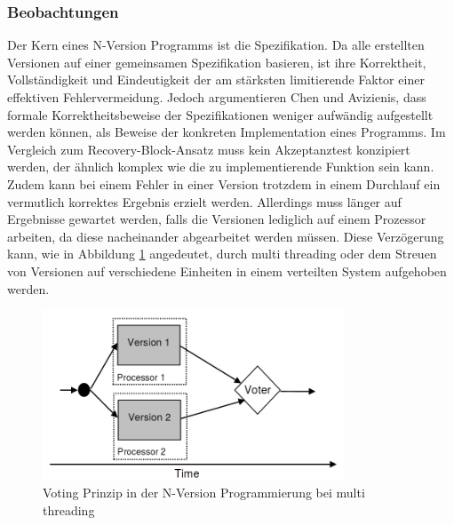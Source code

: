\subsubsection{Beobachtungen}
Der Kern eines N-Version Programms ist die Spezifikation.
Da alle erstellten Versionen auf einer gemeinsamen Spezifikation basieren, ist ihre Korrektheit, Vollständigkeit und Eindeutigkeit der am stärksten limitierende Faktor einer effektiven Fehlervermeidung.
Jedoch argumentieren Chen und Avizienis, dass formale Korrektheitsbeweise der Spezifikationen weniger aufwändig aufgestellt werden können, als Beweise der konkreten Implementation eines Programms.
Im Vergleich zum Recovery-Block-Ansatz muss kein Akzeptanztest konzipiert werden, der ähnlich komplex wie die zu implementierende Funktion sein kann. Zudem kann bei einem Fehler in einer Version trotzdem in einem Durchlauf ein vermutlich korrektes Ergebnis erzielt werden. Allerdings muss länger auf Ergebnisse gewartet werden, falls die Versionen lediglich auf einem Prozessor arbeiten, da diese nacheinander abgearbeitet werden müssen. Diese Verzögerung kann, wie in Abbildung \ref{graph-n-version-multi} angedeutet, durch multi threading oder dem Streuen von Versionen auf verschiedene Einheiten in einem verteilten System aufgehoben werden.
%
\begin{figure}[ht]
	\centering
	\includegraphics[width=0.8\textwidth,natwidth=901,natheight=333]{grafiken/multi-thread-n-version.png}
	\caption{Voting Prinzip in der N-Version Programmierung bei multi threading \cite{lucent}}
	\label{graph-n-version-multi}
\end{figure}
%

